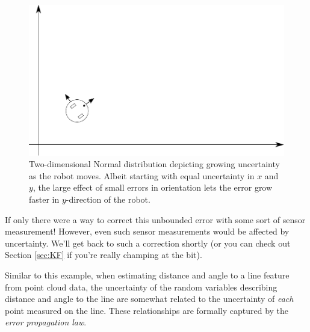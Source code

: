 \begin{figure}
	\centering
		\includegraphics[width=\textwidth]{figs/errorprop_odometry}
	\caption{Two-dimensional Normal distribution depicting growing uncertainty as the robot moves. Albeit starting with equal
    uncertainty in $x$ and $y$, the large effect of small errors in orientation lets the error grow faster in $y$-direction of the robot.}
	\label{fig:errorprop_odometry}
\end{figure}

If only there were a way to correct this unbounded error with some sort of sensor measurement! However, even such sensor measurements would be affected by uncertainty. We'll get back to such a correction shortly (or you can check out Section \ref{sec:KF} if you're really champing at the bit).

Similar to this example, when estimating distance and angle to a line feature from point cloud data, the uncertainty of the random variables describing distance and angle to the line are somewhat related to the uncertainty of \emph{each} point measured on the line. These relationships are formally captured by the \emph{error propagation law}.

